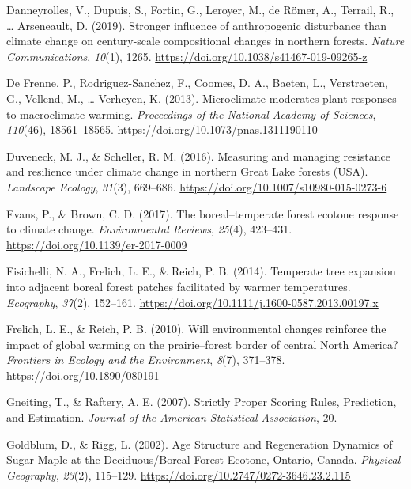 \documentclass[a4paperpaper,]{article}
\begin{document}
\leavevmode\hypertarget{ref-danneyrolles_stronger_2019}{}%
Danneyrolles, V., Dupuis, S., Fortin, G., Leroyer, M., de Römer, A.,
Terrail, R., \ldots{} Arseneault, D. (2019). Stronger influence of
anthropogenic disturbance than climate change on century-scale
compositional changes in northern forests. \emph{Nature Communications},
\emph{10}(1), 1265. \url{https://doi.org/10.1038/s41467-019-09265-z}

\leavevmode\hypertarget{ref-de_frenne_microclimate_2013}{}%
De Frenne, P., Rodriguez-Sanchez, F., Coomes, D. A., Baeten, L.,
Verstraeten, G., Vellend, M., \ldots{} Verheyen, K. (2013). Microclimate
moderates plant responses to macroclimate warming. \emph{Proceedings of
the National Academy of Sciences}, \emph{110}(46), 18561--18565.
\url{https://doi.org/10.1073/pnas.1311190110}

\leavevmode\hypertarget{ref-duveneck_measuring_2016}{}%
Duveneck, M. J., \& Scheller, R. M. (2016). Measuring and managing
resistance and resilience under climate change in northern Great Lake
forests (USA). \emph{Landscape Ecology}, \emph{31}(3), 669--686.
\url{https://doi.org/10.1007/s10980-015-0273-6}

\leavevmode\hypertarget{ref-evans_borealtemperate_2017}{}%
Evans, P., \& Brown, C. D. (2017). The boreal--temperate forest ecotone
response to climate change. \emph{Environmental Reviews}, \emph{25}(4),
423--431. \url{https://doi.org/10.1139/er-2017-0009}

\leavevmode\hypertarget{ref-fisichelli_temperate_2014}{}%
Fisichelli, N. A., Frelich, L. E., \& Reich, P. B. (2014). Temperate
tree expansion into adjacent boreal forest patches facilitated by warmer
temperatures. \emph{Ecography}, \emph{37}(2), 152--161.
\url{https://doi.org/10.1111/j.1600-0587.2013.00197.x}

\leavevmode\hypertarget{ref-frelich_will_2010}{}%
Frelich, L. E., \& Reich, P. B. (2010). Will environmental changes
reinforce the impact of global warming on the prairie--forest border of
central North America? \emph{Frontiers in Ecology and the Environment},
\emph{8}(7), 371--378. \url{https://doi.org/10.1890/080191}

\leavevmode\hypertarget{ref-gneiting_strictly_2007}{}%
Gneiting, T., \& Raftery, A. E. (2007). Strictly Proper Scoring Rules,
Prediction, and Estimation. \emph{Journal of the American Statistical
Association}, 20.

\leavevmode\hypertarget{ref-goldblum_age_2002}{}%
Goldblum, D., \& Rigg, L. (2002). Age Structure and Regeneration
Dynamics of Sugar Maple at the Deciduous/Boreal Forest Ecotone, Ontario,
Canada. \emph{Physical Geography}, \emph{23}(2), 115--129.
\url{https://doi.org/10.2747/0272-3646.23.2.115}
\end{document}
